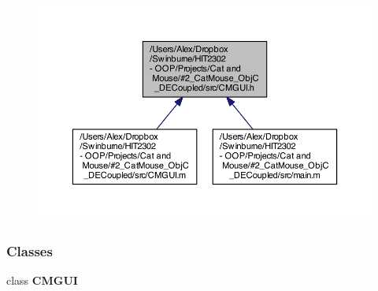\begin{figure}[H]
\begin{center}
\leavevmode
\includegraphics[width=350pt]{_c_m_g_u_i_8h__dep__incl}
\end{center}
\end{figure}
\subsubsection*{Classes}
\begin{DoxyCompactItemize}
\item 
class {\bf C\-M\-G\-U\-I}
\end{DoxyCompactItemize}
